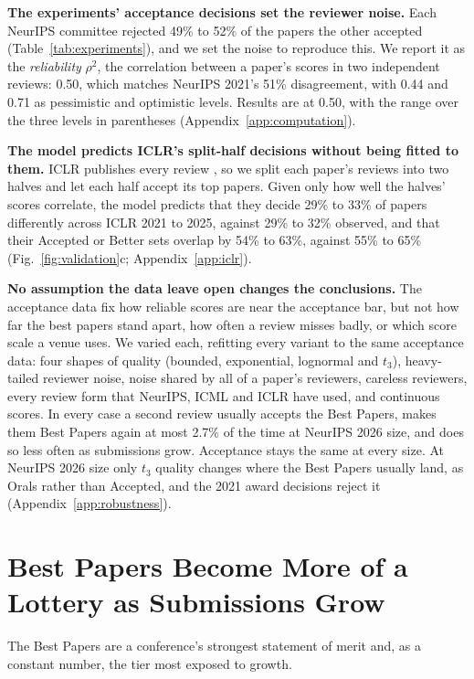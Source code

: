 \documentclass{article}
\begin{document}
\textbf{The experiments' acceptance decisions set the reviewer noise.} Each NeurIPS committee rejected 49\% to 52\% of the papers the other accepted (Table~\ref{tab:experiments}), and we set the noise to reproduce this. We report it as the \emph{reliability} $\rho^2$, the correlation between a paper's scores in two independent reviews: 0.50, which matches NeurIPS 2021's 51\% disagreement, with 0.44 \citep{price2014nips} and 0.71 \citep{berenslab_iclr} as pessimistic and optimistic levels. Results are at 0.50, with the range over the three levels in parentheses (Appendix~\ref{app:computation}).

\textbf{The model predicts ICLR's split-half decisions without being fitted to them.} ICLR publishes every review \citep{paperlists}, so we split each paper's reviews into two halves and let each half accept its top papers. Given only how well the halves' scores correlate, the model predicts that they decide 29\% to 33\% of papers differently across ICLR 2021 to 2025, against 29\% to 32\% observed, and that their Accepted or Better sets overlap by 54\% to 63\%, against 55\% to 65\% (Fig.~\ref{fig:validation}c; Appendix~\ref{app:iclr}).

\textbf{No assumption the data leave open changes the conclusions.}\label{sec:sure} The acceptance data fix how reliable scores are near the acceptance bar, but not how far the best papers stand apart, how often a review misses badly, or which score scale a venue uses. We varied each, refitting every variant to the same acceptance data: four shapes of quality (bounded, exponential, lognormal and $t_3$), heavy-tailed reviewer noise, noise shared by all of a paper's reviewers, careless reviewers, every review form that NeurIPS, ICML and ICLR have used, and continuous scores. In every case a second review usually accepts the Best Papers, makes them Best Papers again at most 2.7\% of the time at NeurIPS 2026 size, and does so less often as submissions grow. Acceptance stays the same at every size. At NeurIPS 2026 size only $t_3$ quality changes where the Best Papers usually land, as Orals rather than Accepted, and the 2021 award decisions reject it (Appendix~\ref{app:robustness}).

\section{Best Papers Become More of a Lottery as Submissions Grow}\label{sec:bestpaper}

The Best Papers are a conference's strongest statement of merit and, as a constant number, the tier most exposed to growth.
\end{document}
